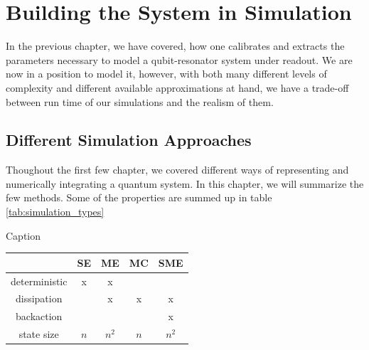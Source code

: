 \chapter{Building the System in Simulation}
In the previous chapter, we have covered, how one calibrates and extracts the parameters necessary to model a qubit-resonator system under readout. We are now in a position to model it, however, with both many different levels of complexity and different available approximations at hand, we have a trade-off between run time of our simulations and the realism of them. 

\section{Different Simulation Approaches}
Thoughout the first few chapter, we covered different ways of representing and numerically integrating a quantum system. In this chapter, we will summarize the few methods. Some of the properties are summed up in table \ref{tab:simulation_types}

\begin{margintable}
    \caption{Caption}
    \centering
    \begin{tabular}{c|c|c|c|c}
                    &  SE   & ME    & MC    & SME \\ \hline 
    deterministic   & x     & x     &       &      \\
    dissipation     &       & x     & x     & x    \\ 
    backaction      &       &       &       & x    \\
    state size      & $n$   & $n^2$ & $n$   & $n^2$
    \end{tabular}
    \label{tab:simulation_types}
\end{margintable}

